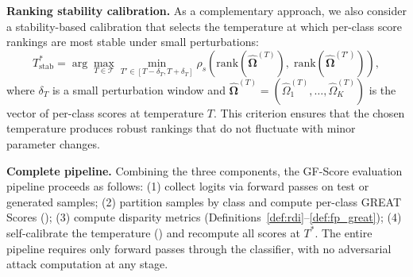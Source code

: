 \textbf{Ranking stability calibration.} As a complementary approach, we also consider a stability-based calibration that selects the temperature at which per-class score rankings are most stable under small perturbations:
\begin{equation}
    T^*_{\mathrm{stab}} = \arg\max_{T \in \mathcal{T}} \min_{T' \in [T - \delta_T, T + \delta_T]} \rho_s\!\left(\mathrm{rank}(\hat{\boldsymbol{\Omega}}^{(T)}),\; \mathrm{rank}(\hat{\boldsymbol{\Omega}}^{(T')})\right),
    \label{eq:stability_calibration}
\end{equation}
where $\delta_T$ is a small perturbation window and $\hat{\boldsymbol{\Omega}}^{(T)} = (\hat{\Omega}_1^{(T)}, \ldots, \hat{\Omega}_K^{(T)})$ is the vector of per-class scores at temperature $T$. This criterion ensures that the chosen temperature produces robust rankings that do not fluctuate with minor parameter changes.

\textbf{Complete pipeline.} Combining the three components, the GF-Score evaluation pipeline proceeds as follows: (1) collect logits via forward passes on test or generated samples; (2) partition samples by class and compute per-class GREAT Scores (); (3) compute disparity metrics (Definitions~\ref{def:rdi}--\ref{def:fp_great}); (4) self-calibrate the temperature () and recompute all scores at $T^*$. The entire pipeline requires only forward passes through the classifier, with no adversarial attack computation at any stage.